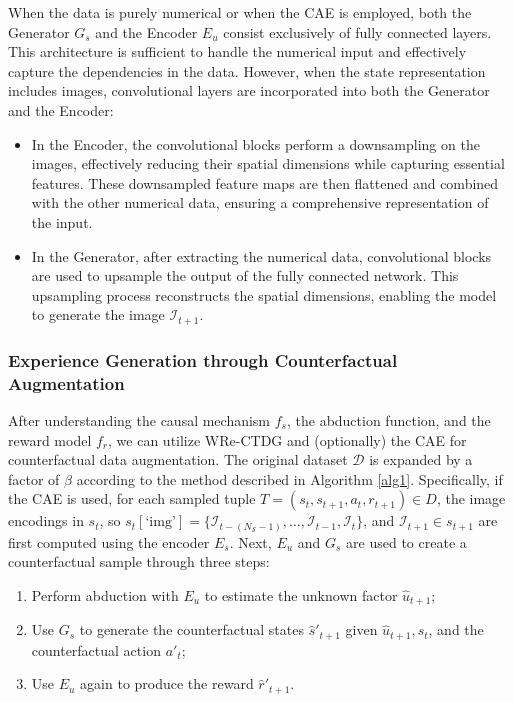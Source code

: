 When the data is purely numerical or when the
CAE is employed, both the Generator $G_s$ and the
Encoder $E_u$ consist exclusively of fully connected
layers. This architecture is sufficient to handle
the numerical input and effectively capture the dependencies
in the data. However, when the state representation
includes images, convolutional layers are incorporated
into both the Generator and the Encoder:
\begin{itemize}
    \item In the Encoder, the convolutional blocks perform a
    downsampling on the images, effectively reducing their
    spatial dimensions while capturing essential features.
    These downsampled feature maps are then flattened
    and combined with the other numerical data,
    ensuring a comprehensive representation of the input.

    \item In the Generator, after extracting the numerical data,
    convolutional blocks are used to upsample the output of
    the fully connected network. This upsampling process
    reconstructs the spatial dimensions,
    enabling the model to generate the image $\mathcal{I}_{t+1}$.
\end{itemize}

\subsubsection{Experience Generation through Counterfactual Augmentation}

After understanding the causal mechanism \( f_s \),
the abduction function, and the reward model \( f_r \),
we can utilize WRe-CTDG and (optionally) the CAE
for counterfactual
data augmentation. The original dataset \( \mathcal{D} \)
is expanded by a factor of \( \beta \)
according to the method described in Algorithm \ref{alg1}.
Specifically, if the CAE is used, for each sampled tuple
\( T = (s_t, s_{t+1}, a_t, r_{t+1}) \in D \),
the image encodings in $s_t$, so
\( s_t[\text{`img'}] = \{\mathcal{I}_{t-(N_{\mathcal{S}}-1)}, \ldots, \mathcal{I}_{t-1}, \mathcal{I}_t\} \),
and \( \mathcal{I}_{t+1} \in s_{t+1} \) are first computed using
the encoder \( E_s \). Next, \( E_u \) and \( G_s \)
are used to create a counterfactual
sample through three steps:
\begin{enumerate}
    \item Perform abduction with \( E_u \) to estimate
    the unknown factor \( \hat{u}_{t+1} \);
    \item Use \( G_s \) to generate the counterfactual
    states \( \hat{s}'_{t+1} \) given
    \( \hat{u}_{t+1}, s_t \), and the counterfactual
    action \( a'_t \);
    \item Use \( E_u \) again to produce the reward
    \( \hat{r}'_{t+1} \).
\end{enumerate}


